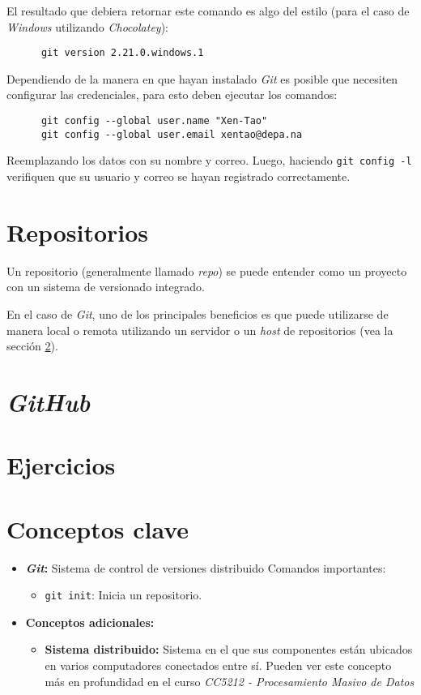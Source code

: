     El resultado que debiera retornar este comando es algo del estilo (para el caso de 
    \textit{Windows} utilizando \textit{Chocolatey}):

    \begin{verbatim}
      git version 2.21.0.windows.1
    \end{verbatim}

    Dependiendo de la manera en que hayan instalado \textit{Git} es posible que 
    necesiten configurar las credenciales, para esto deben ejecutar los comandos:
    \begin{verbatim}
      git config --global user.name "Xen-Tao"
      git config --global user.email xentao@depa.na
    \end{verbatim}

    Reemplazando los datos con su nombre y correo.
    Luego, haciendo \texttt{git config -l} verifiquen que su usuario y correo se
    hayan registrado correctamente.

  \section{Repositorios}
    Un repositorio (generalmente llamado \textit{repo}) se puede entender como un proyecto
    con un sistema de versionado integrado.

    En el caso de \textit{Git}, uno de los principales beneficios es que puede utilizarse
    de manera local o remota utilizando un servidor o un \textit{host} de repositorios 
    (vea la sección \ref{sec:github}).

  \section{\textit{GitHub}}
    \label{sec:github}

  \section{Ejercicios}
  \section{Conceptos clave}
    \begin{itemize}
      \item \textbf{\textit{Git}:} Sistema de control de versiones distribuido
        Comandos importantes:
        \begin{itemize}
          \item \texttt{git init}: Inicia un repositorio.
        \end{itemize}
      \item \textbf{Conceptos adicionales:}
        \begin{itemize}
          \item \textbf{Sistema distribuido:\label{kw:distr-sist}}
            Sistema en el que sus componentes están ubicados en varios computadores 
            conectados entre sí.
            Pueden ver este concepto más en profundidad en el curso \textit{CC5212 - 
            Procesamiento Masivo de Datos}
        \end{itemize} 
    \end{itemize}

